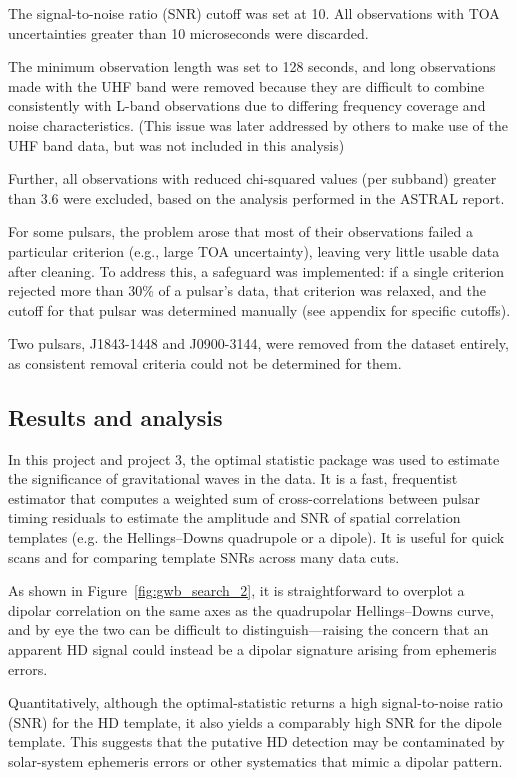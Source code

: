 \documentclass[12pt,a4paper]{article}
\begin{document}
The signal-to-noise ratio (SNR) cutoff was set at 10. All observations with TOA uncertainties greater than 10 microseconds were discarded.

The minimum observation length was set to 128 seconds, and long observations made with the UHF band were removed because they are difficult to combine consistently with L-band observations due to differing frequency coverage and noise characteristics. (This issue was later addressed by others to make use of the UHF band data, but was not included in this analysis)

Further, all observations with reduced chi-squared values (per subband) greater than 3.6 were excluded, based on the analysis performed in the ASTRAL report.

For some pulsars, the problem arose that most of their observations failed a particular criterion (e.g., large TOA uncertainty), leaving very little usable data after cleaning. To address this, a safeguard was implemented: if a single criterion rejected more than 30\% of a pulsar's data, that criterion was relaxed, and the cutoff for that pulsar was determined manually (see appendix for specific cutoffs).

Two pulsars, J1843-1448 and J0900-3144, were removed from the dataset entirely, as consistent removal criteria could not be determined for them.


\subsection{Results and analysis}
In this project and project 3, the optimal statistic package was used to estimate the significance of gravitational waves in the data. It is a fast, frequentist estimator that computes a weighted sum of cross-correlations between pulsar timing residuals to estimate the amplitude and SNR of spatial correlation templates (e.g. the Hellings--Downs quadrupole or a dipole). It is useful for quick scans and for comparing template SNRs across many data cuts. 

As shown in Figure~\ref{fig:gwb_search_2}, it is straightforward to overplot a dipolar correlation on the same axes as the quadrupolar Hellings--Downs curve, and by eye the two can be difficult to distinguish---raising the concern that an apparent HD signal could instead be a dipolar signature arising from ephemeris errors.

Quantitatively, although the optimal-statistic returns a high signal-to-noise ratio (SNR) for the HD template, it also yields a comparably high SNR for the dipole template. This suggests that the putative HD detection may be contaminated by solar-system ephemeris errors or other systematics that mimic a dipolar pattern.
\end{document}
